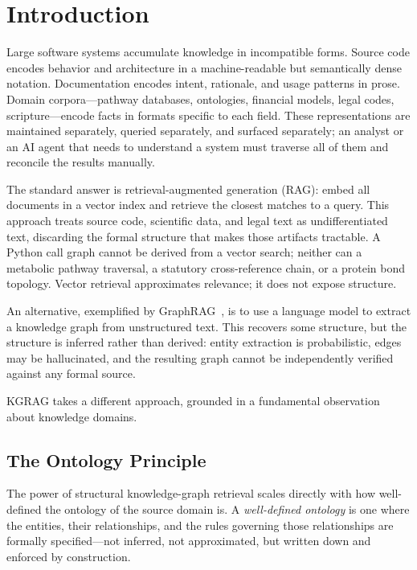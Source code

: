 \documentclass[10pt]{article}
\begin{document}
\section{Introduction}

Large software systems accumulate knowledge in incompatible forms. Source code
encodes behavior and architecture in a machine-readable but semantically dense
notation. Documentation encodes intent, rationale, and usage patterns in prose.
Domain corpora---pathway databases, ontologies, financial models, legal codes,
scripture---encode facts in formats specific to each field. These representations
are maintained separately, queried separately, and surfaced separately; an
analyst or an AI agent that needs to understand a system must traverse all of
them and reconcile the results manually.

The standard answer is retrieval-augmented generation (RAG): embed all documents
in a vector index and retrieve the closest matches to a query. This approach
treats source code, scientific data, and legal text as undifferentiated text,
discarding the formal structure that makes those artifacts tractable. A Python
call graph cannot be derived from a vector search; neither can a metabolic
pathway traversal, a statutory cross-reference chain, or a protein bond
topology. Vector retrieval approximates relevance; it does not expose structure.

An alternative, exemplified by GraphRAG~\cite{edge2024graphrag}, is to use a
language model to extract a knowledge graph from unstructured text. This
recovers some structure, but the structure is inferred rather than derived:
entity extraction is probabilistic, edges may be hallucinated, and the resulting
graph cannot be independently verified against any formal source.

KGRAG takes a different approach, grounded in a fundamental observation about
knowledge domains.

\subsection{The Ontology Principle}

The power of structural knowledge-graph retrieval scales directly with how
well-defined the ontology of the source domain is. A \emph{well-defined
ontology} is one where the entities, their relationships, and the rules
governing those relationships are formally specified---not inferred, not
approximated, but written down and enforced by construction.
\end{document}
